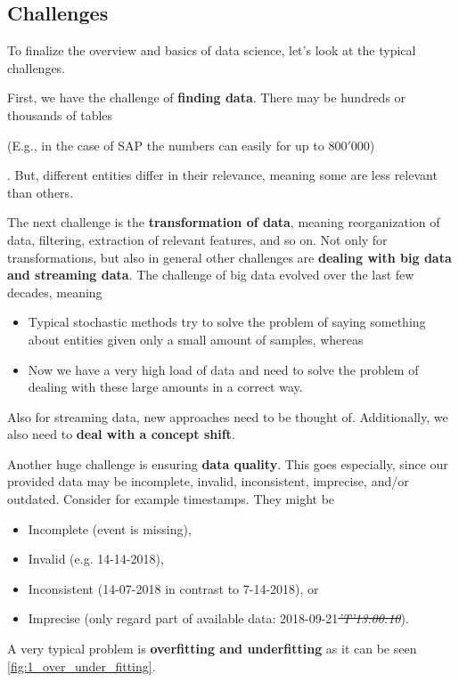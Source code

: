\subsection{Challenges}
To finalize the overview and basics of data science, let's look at the typical challenges.

First, we have the challenge of \textbf{finding data}. There may be hundreds or thousands of tables \begin{note}(E.g., in the case of SAP the numbers can easily for up to $800'000$)\end{note}. But, different entities differ in their relevance, meaning some are less relevant than others.

The next challenge is the \textbf{transformation of data}, meaning reorganization of data, filtering, extraction of relevant features, and so on. Not only for transformations, but also in general other challenges are \textbf{dealing with big data and streaming data}. The challenge of big data evolved over the last few decades, meaning
\begin{itemize}
  \item Typical stochastic methods try to solve the problem of saying something about entities given only a small amount of samples, whereas
  \item Now we have a very high load of data and need to solve the problem of dealing with these large amounts in a correct way. 
\end{itemize}
Also for streaming data, new approaches need to be thought of. Additionally, we also need to \textbf{deal with a concept shift}.

Another huge challenge is ensuring \textbf{data quality}. This goes especially, since our provided data may be incomplete, invalid, inconsistent, imprecise, and/or outdated. Consider for example timestamps. They might be 
\begin{itemize}
  \item Incomplete {\color{gray}\footnotesize(event is missing)}, 
  \item Invalid {\color{gray}\footnotesize(e.g. 14-14-2018)},
  \item Inconsistent {\color{gray}\footnotesize(14-07-2018 in contrast to 7-14-2018)}, or
  \item Imprecise {\color{gray}\footnotesize(only regard part of available data: 2018-09-21\textit{\st{'T'13:00:10}})}.
\end{itemize}

A very typical problem is \textbf{overfitting and underfitting} as it can be seen \ref{fig:1_over_under_fitting}.

